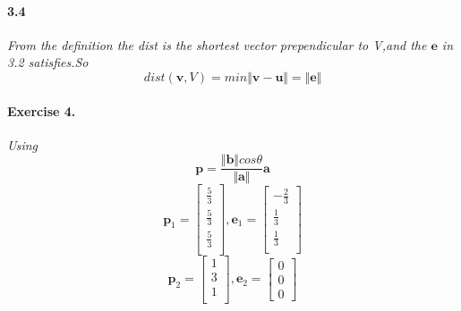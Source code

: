 \documentclass{article}
\begin{document}
    \paragraph{3.4}
        \textit{
            From the definition the dist is the shortest vector prependicular to V,and the $\mathbf{e}$ in 3.2 satisfies.So 
            \[
            dist(\mathbf{v},V)=min \Vert \mathbf{v}-\mathbf{u} \Vert = \Vert \mathbf{e} \Vert
            \]
        }
\paragraph{Exercise 4.}
    \textit{
        Using
        \[
        \mathbf{p}=\frac{\Vert \mathbf{b} \Vert cos \theta }{\Vert \mathbf{a} \Vert} \mathbf{a}
        \]
        \[
        \mathbf{p}_1=\begin{bmatrix}
            \frac{5}{3} \\
            \frac{5}{3} \\
            \frac{5}{3} \\
        \end{bmatrix} , 
        \mathbf{e}_1=\begin{bmatrix}
            -\frac{2}{3} \\
            \frac{1}{3} \\
            \frac{1}{3} \\
        \end{bmatrix}
        \]
        \[
            \mathbf{p}_2=\begin{bmatrix}
                1\\
                3\\
                1\\
            \end{bmatrix} , 
            \mathbf{e}_2=\begin{bmatrix}
                0\\0\\0
            \end{bmatrix}
            \]
    }
\end{document}
